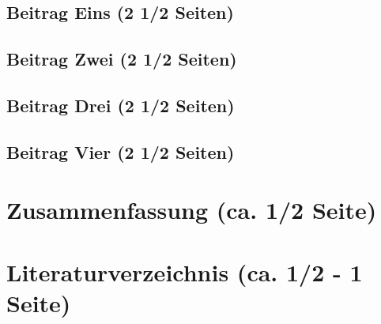 \documentclass[a4paper]{article}
\begin{document}

\subsection{Beitrag Eins (2 1/2 Seiten)}






\subsection{Beitrag Zwei (2 1/2 Seiten)}






\subsection{Beitrag Drei (2 1/2 Seiten)}






\subsection{Beitrag Vier (2 1/2 Seiten)}






\section{Zusammenfassung (ca. 1/2 Seite)}






\section{Literaturverzeichnis (ca. 1/2 - 1 Seite)}
\end{document}
